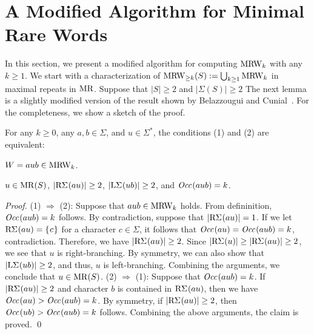 
\section{A Modified Algorithm for Minimal Rare Words}
\label{sec:mrw}

In this section, we present a modified algorithm for computing $\MRWK[k]$ with any $k\ge 1$. 
We start with a characterization of $\MRWS[\ge k](S) := \bigcup_{k\ge 1}\MRWK[k]$ in maximal repeats in $\MR$. 
Suppose that $|S|\ge 2$ and $|\Sigma(S)|\ge 2$
The next lemma is a slightly modified version of the result shown by Belazzougui and Cunial~\cite{belazzougui2015space:unusual}. For the completeness, we show a sketch of the proof. 

\begin{lemma}\label{lem:characterization:mrw}
For any $k\ge 0$, any $a, b \in \Sigma$, and $u\in\Sigma^*$, the conditions (1) and (2) are equivalent: 
\begin{enumerate*}[(1)]
\item $W = aub \in \MRWK[k]$. 
\item $u\in\MR(S)$, $|\RSigma[](au)| \ge 2$, $|\LSigma[](ub)| \ge 2$, and $\Occ[](aub) = k$. 
\end{enumerate*}
\end{lemma}

\begin{proof}
  (1) $\Rightarrow$ (2):  Suppose that $aub \in \MRWK[k]$ holds. From defininition, $\Occ[](aub) = k$ follows. By contradiction, suppose that $|\RSigma[](au)| = 1$. If we let $\RSigma[](au) = \set{c}$ for a character $c \in \Sigma$, it follows that $\Occ[](au) = \Occ[](aub) = k$, contradiction. Therefore, we have $|\RSigma[](au)| \ge 2$. Since $|\RSigma[](u)| \ge |\RSigma[](au)| \ge 2$, we see that $u$ is right-branching. By symmetry, we can also show that $|\LSigma[](ub)| \ge 2$, and thus, $u$ is left-branching. Combining the arguments, we conclude that $u \in \MR(S)$.
 (2) $\Rightarrow$ (1):  Suppose that $\Occ[](aub) = k$. 
  If $|\RSigma[](au)| \ge 2$ and character $b$ is contained in $\RSigma[](au)$, then we have $\Occ[](au) > \Occ[](aub) = k$. By symmetry, if $|\RSigma[](au)| \ge 2$, then $\Occ[](ub) > \Occ[](aub) = k$ follows. Combining the above arguments, the claim is proved. 
\qed\end{proof}



